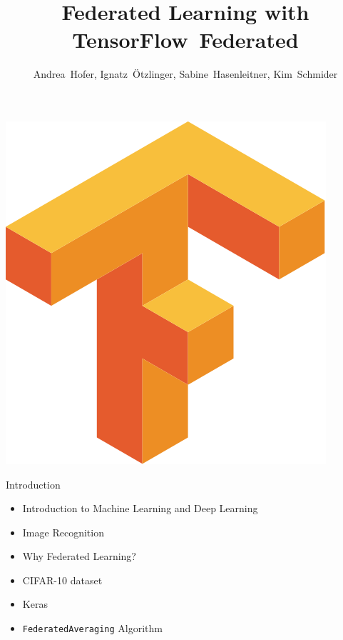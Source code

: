 \documentclass{beamer}{}
\title{\huge Federated Learning with TensorFlow~Federated}
\author{Andrea~Hofer, Ignatz~\"Otzlinger, Sabine~Hasenleitner, Kim~Schmider}
\date{}
\begin{document}
    \begin{frame}[plain]
        \maketitle
        \vspace{-.2\textheight}\center\includegraphics[height=.3\textheight]{img/Tensorflow_logo.png}
    \end{frame}
    \begin{frame} {Introduction}
        \begin{itemize}
            \item Introduction to Machine Learning and Deep Learning
            \item Image Recognition
            \item Why Federated Learning?
            \item CIFAR-10 dataset
            \item Keras
            \item \texttt{FederatedAveraging} Algorithm
        \end{itemize}
    \end{frame}
\end{document}
